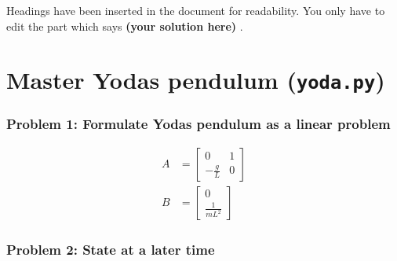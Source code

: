\documentclass[12pt,twoside]{article}
\newcommand\redt[1]{ {\textcolor[rgb]{0.60, 0.00, 0.00}{\textbf{ #1} } } }
\newcommand{\yoursolution}{ \redt{(your solution here) } }
\begin{document}
Headings have been inserted in the document for readability. You only have to edit the part which says \yoursolution. 

\section{Master Yodas pendulum (\texttt{yoda.py})}\label{yoda1}
\subsubsection*{{\color{red}Problem 1:  Formulate Yodas pendulum as a linear problem}}
	
	\begin{align}
		A & = \begin{bmatrix} 0 & 1 \\ -\frac{g}{L} & 0 \end{bmatrix}  \\
		B & = \begin{bmatrix} 0 \\ \frac{1}{mL^2}\end{bmatrix}
	\end{align}
	
\subsubsection*{{\color{red}Problem 2:  State at a later time}}
\end{document}
